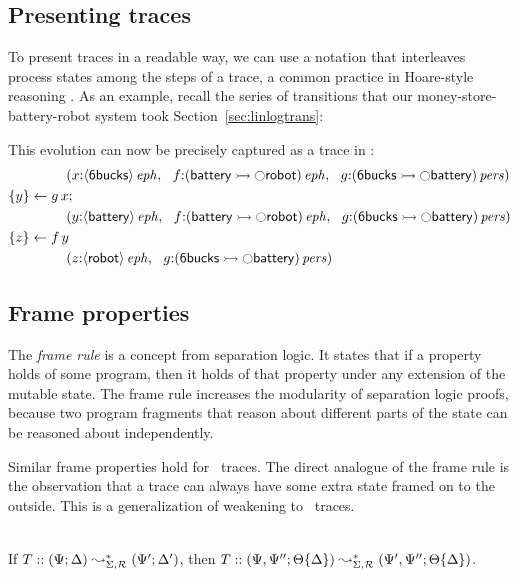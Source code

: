 \subsection{Presenting traces}

To present traces in a readable way, we can use a notation that
interleaves process states among the steps of a trace, a common
practice in Hoare-style reasoning \cite{hoare71proof}.  As an example,
recall the series of transitions that our money-store-battery-robot
system took Section~\ref{sec:linlogtrans}: 
%

%
This evolution can now be precisely captured as a trace in \sls:
\begin{align*}
&\qquad\qquad
\left(
 x{:}{\langle {\sf 6bucks} \rangle}\,{{\it eph}}, ~~
 f{:}{({\sf battery} \rightarrowtail {\ocircle}{\sf robot})}\,{{\it eph}}, ~~
 g{:}{({\sf 6bucks} \rightarrowtail {\ocircle}{\sf battery})}\,{{\it pers}}
\right)
\\
&\{{y}\} \leftarrow {g\,x};
\\
&\qquad\qquad
\left(
 y{:}{\langle {\sf battery} \rangle}\,{{\it eph}}, ~~
 f{:}{({\sf battery} \rightarrowtail {\ocircle}{\sf robot})}\,{{\it eph}}, ~~
 g{:}{({\sf 6bucks} \rightarrowtail {\ocircle}{\sf battery})}\,{{\it pers}}
\right)
\\
&\{{z}\} \leftarrow {f\,y}
\\
&\qquad\qquad
\left(
 z{:}{\langle {\sf robot} \rangle}\,{{\it eph}}, ~~
 g{:}{({\sf 6bucks} \rightarrowtail {\ocircle}{\sf battery})}\,{{\it pers}}
\right)
\end{align*}

\subsection{Frame properties}

The {\it frame rule} is a concept from separation logic.  It
states that if a property holds of some program, then it holds of that
property under any extension of the mutable state. The frame rule
increases the modularity of separation logic proofs, because two
program fragments that reason about different parts of the state can
be reasoned about independently. 

Similar frame properties hold for \sls~traces. The direct analogue of
the frame rule is the observation that a trace can always have some
extra state framed on to the outside. This is a generalization of
weakening to \sls~traces.

\bigskip
\begin{theorem}\label{thm:frameweak}~\\
If $T :: (\Psi; \Delta) \leadsto^*_{\Sigma, \mathcal R} (\Psi'; \Delta')$, then
$T :: (\Psi, \Psi''; {\Theta}\{{\Delta}\})
       \leadsto^*_{\Sigma, \mathcal R} (\Psi', \Psi''; {\Theta}\{{\Delta}\})$.
\end{theorem}
\bigskip

